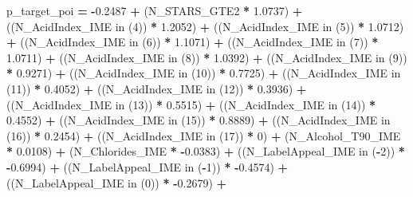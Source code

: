 \documentclass[]{article}
\newenvironment{Shaded}{\begin{snugshade}}{\end{snugshade}}
\newcommand{\KeywordTok}[1]{\textcolor[rgb]{0.13,0.29,0.53}{\textbf{{#1}}}}
\newcommand{\DecValTok}[1]{\textcolor[rgb]{0.00,0.00,0.81}{{#1}}}
\newcommand{\FloatTok}[1]{\textcolor[rgb]{0.00,0.00,0.81}{{#1}}}
\newcommand{\NormalTok}[1]{{#1}}
\begin{document}
\begin{Shaded}
\begin{Highlighting}[]
{{{{{{{{{{{{{{{{{{{{{{{{{{{{{{{{{{{{{{{{{{{{{{{{{    \NormalTok{p_target_poi }\KeywordTok{=} \KeywordTok{-}\FloatTok{0.2487} \KeywordTok{+}
    \NormalTok{(N_STARS_GTE2   }\KeywordTok{*}   \FloatTok{1.0737}\NormalTok{)   }\KeywordTok{+}
    \NormalTok{((N_AcidIndex_IME  in (}\DecValTok{4}\NormalTok{)) }\KeywordTok{*}   \FloatTok{1.2052}\NormalTok{)   }\KeywordTok{+}
    \NormalTok{((N_AcidIndex_IME  in (}\DecValTok{5}\NormalTok{)) }\KeywordTok{*}   \FloatTok{1.0712}\NormalTok{)   }\KeywordTok{+}
    \NormalTok{((N_AcidIndex_IME  in (}\DecValTok{6}\NormalTok{)) }\KeywordTok{*}   \FloatTok{1.1071}\NormalTok{)   }\KeywordTok{+}
    \NormalTok{((N_AcidIndex_IME  in (}\DecValTok{7}\NormalTok{)) }\KeywordTok{*}   \FloatTok{1.0711}\NormalTok{)   }\KeywordTok{+}
    \NormalTok{((N_AcidIndex_IME  in (}\DecValTok{8}\NormalTok{)) }\KeywordTok{*}   \FloatTok{1.0392}\NormalTok{)   }\KeywordTok{+}
    \NormalTok{((N_AcidIndex_IME  in (}\DecValTok{9}\NormalTok{)) }\KeywordTok{*}   \FloatTok{0.9271}\NormalTok{)   }\KeywordTok{+}
    \NormalTok{((N_AcidIndex_IME  in (}\DecValTok{10}\NormalTok{)) }\KeywordTok{*}   \FloatTok{0.7725}\NormalTok{)   }\KeywordTok{+}
    \NormalTok{((N_AcidIndex_IME  in (}\DecValTok{11}\NormalTok{)) }\KeywordTok{*}   \FloatTok{0.4052}\NormalTok{)   }\KeywordTok{+}
    \NormalTok{((N_AcidIndex_IME  in (}\DecValTok{12}\NormalTok{)) }\KeywordTok{*}   \FloatTok{0.3936}\NormalTok{)   }\KeywordTok{+}
    \NormalTok{((N_AcidIndex_IME  in (}\DecValTok{13}\NormalTok{)) }\KeywordTok{*}   \FloatTok{0.5515}\NormalTok{)   }\KeywordTok{+}
    \NormalTok{((N_AcidIndex_IME  in (}\DecValTok{14}\NormalTok{)) }\KeywordTok{*}   \FloatTok{0.4552}\NormalTok{)   }\KeywordTok{+}
    \NormalTok{((N_AcidIndex_IME  in (}\DecValTok{15}\NormalTok{)) }\KeywordTok{*}   \FloatTok{0.8889}\NormalTok{)   }\KeywordTok{+}
    \NormalTok{((N_AcidIndex_IME  in (}\DecValTok{16}\NormalTok{)) }\KeywordTok{*}   \FloatTok{0.2454}\NormalTok{)   }\KeywordTok{+}
    \NormalTok{((N_AcidIndex_IME  in (}\DecValTok{17}\NormalTok{)) }\KeywordTok{*}   \DecValTok{0}\NormalTok{)   }\KeywordTok{+}
    \NormalTok{(N_Alcohol_T90_IME   }\KeywordTok{*}   \FloatTok{0.0108}\NormalTok{)   }\KeywordTok{+}
    \NormalTok{(N_Chlorides_IME   }\KeywordTok{*}   \KeywordTok{-}\FloatTok{0.0383}\NormalTok{)   }\KeywordTok{+}
    \NormalTok{((N_LabelAppeal_IME  in (}\KeywordTok{-}\DecValTok{2}\NormalTok{)) }\KeywordTok{*}   \KeywordTok{-}\FloatTok{0.6994}\NormalTok{)   }\KeywordTok{+}
    \NormalTok{((N_LabelAppeal_IME  in (}\KeywordTok{-}\DecValTok{1}\NormalTok{)) }\KeywordTok{*}   \KeywordTok{-}\FloatTok{0.4574}\NormalTok{)   }\KeywordTok{+}
    \NormalTok{((N_LabelAppeal_IME  in (}\DecValTok{0}\NormalTok{)) }\KeywordTok{*}   \KeywordTok{-}\FloatTok{0.2679}\NormalTok{)   }\KeywordTok{+}
}}}}}}}}}}}}}}}}}}}}}}}}}}}}}}}}}}}}}}}}}}}}}}}}}
\end{Highlighting}
\end{Shaded}
\end{document}
